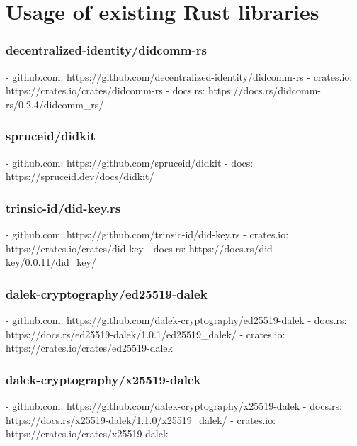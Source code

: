 \section{Usage of existing Rust libraries}

\subsubsection{decentralized-identity/didcomm-rs}

- github.com: https://github.com/decentralized-identity/didcomm-rs
- crates.io: https://crates.io/crates/didcomm-rs
- docs.rs: https://docs.rs/didcomm-rs/0.2.4/didcomm_rs/

\subsubsection{spruceid/didkit}

- github.com: https://github.com/spruceid/didkit
- docs: https://spruceid.dev/docs/didkit/

\subsubsection{trinsic-id/did-key.rs}

- github.com: https://github.com/trinsic-id/did-key.rs
- crates.io: https://crates.io/crates/did-key
- docs.rs: https://docs.rs/did-key/0.0.11/did_key/

\subsubsection{dalek-cryptography/ed25519-dalek}

- github.com: https://github.com/dalek-cryptography/ed25519-dalek
- docs.rs: https://docs.rs/ed25519-dalek/1.0.1/ed25519_dalek/
- crates.io: https://crates.io/crates/ed25519-dalek

\subsubsection{dalek-cryptography/x25519-dalek}

- github.com: https://github.com/dalek-cryptography/x25519-dalek
- docs.rs: https://docs.rs/x25519-dalek/1.1.0/x25519_dalek/
- crates.io: https://crates.io/crates/x25519-dalek

